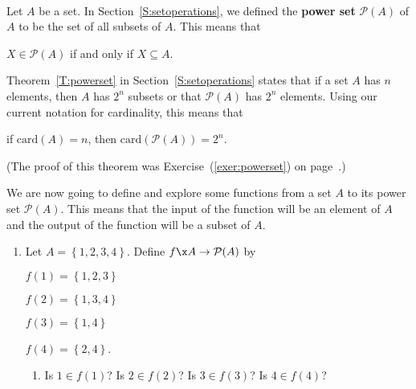 \begin{previewactivity}\label{PA:powerset} \hfill \\
Let $A$ be a set.  In Section~\ref{S:setoperations}, we defined the \textbf{power set}
% 
$\mathcal{P} ( A )$ of $A$ to be the set of all subsets of $A$.  This means that
\begin{center}
$X \in \mathcal{P} ( A )$ if and only if $X \subseteq A$.
\end{center}
%
Theorem~\ref{T:powerset} in Section~\ref{S:setoperations} states that if a set $A$ has $n$ elements, then $A$ has $2^n$ subsets or that $\mathcal{P} ( A )$ has 
$2^n$ elements.  Using our current notation for cardinality, this means that
%
\begin{center}
if $\text{card} ( A ) = n$, then 
$\text{card} ( \mathcal{P} ( A ) ) = 2^n$.
\end{center}
%
(The proof of this theorem was Exercise~(\ref{exer:powerset}) on page~\pageref{exer:powerset}.)
%

We are now going to define and explore some functions from a set $A$ to its power set 
$\mathcal{P} ( A )$.  This means that the input of the function will be an element of $A$ and the output of the function will be a subset of $A$.

\begin{enumerate} 
\item Let $A = \left\{1, 2, 3, 4 \right\}$.  Define $f\x A \to \mathcal{P} ( A )$ by
%
\begin{multicols}{2}
$f ( 1 ) = \left\{ 1, 2, 3 \right\}$

$f ( 2 ) = \left\{ 1, 3, 4 \right\}$

$f ( 3 ) = \left\{ 1, 4 \right\}$

$f ( 4 ) = \left\{ 2, 4 \right\}$.
\end{multicols}
%
\begin{enumerate}
\item Is $1 \in f ( 1 )$?  Is $2 \in f ( 2 )$? Is 
$3 \in f ( 3 )$?  Is $4 \in f ( 4 )$?


\end{enumerate}
\end{enumerate}
\end{previewactivity}
